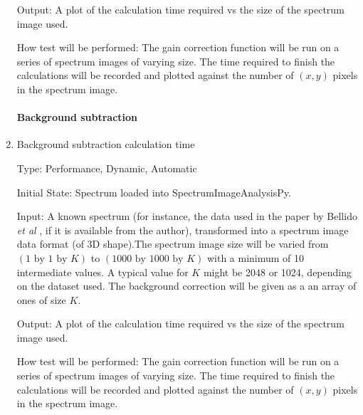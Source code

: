 \documentclass[12pt, titlepage]{article}
\newcommand{\progname}{SpectrumImageAnalysisPy}
\begin{document}
\begin{enumerate}
Output: A plot of the calculation time required vs the size of the spectrum
image used.

How test will be performed: The gain correction function will be run on a series
of spectrum images of varying size. The time required to finish the calculations
will be recorded and plotted against the number of $(x, y)$ pixels in the
spectrum image.\\

\paragraph{Background subtraction}
\item{Background subtraction calculation time}

Type: Performance, Dynamic, Automatic

Initial State: Spectrum loaded into \progname{}.

Input: A known spectrum (for instance, the data used in the paper by
Bellido \textit{et al} \cite{bellido_toward_2014}, if it is available
from the author), transformed into a spectrum image data format (of 3D
shape).The spectrum image size will be varied from
$(1\text{ by }1\text{ by }K)$ to
$(1000 \text{ by } 1000 \text{ by }K)$ with a minimum of 10
intermediate values. A typical value for $K$ might be 2048 or 1024,
depending on the dataset used. The background correction will be given
as a an array of ones of size $K$.

Output: A plot of the calculation time required vs the size of the spectrum
image used.

How test will be performed: The gain correction function will be run on a series
of spectrum images of varying size. The time required to finish the calculations
will be recorded and plotted against the number of $(x, y)$ pixels in the
spectrum image.\\

\end{enumerate}

\end{document}
